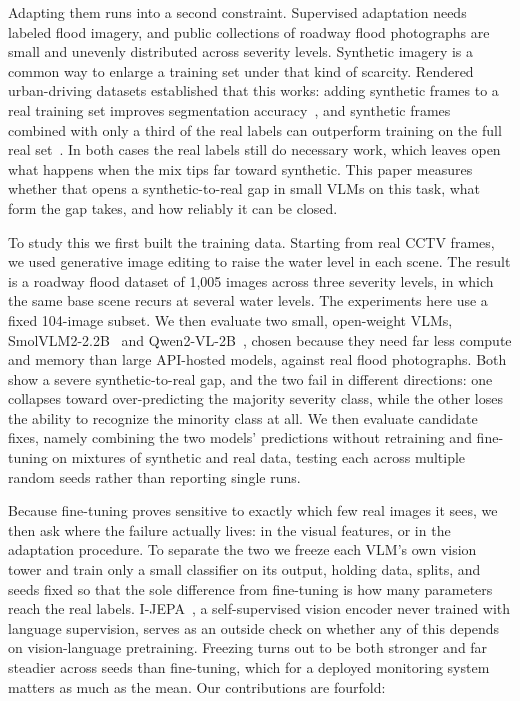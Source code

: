 \documentclass[conference]{IEEEtran}
\begin{document}
Adapting them runs into a second constraint. Supervised adaptation needs labeled flood imagery, and public collections of roadway flood photographs are small and unevenly distributed across severity levels. Synthetic imagery is a common way to enlarge a training set under that kind of scarcity. Rendered urban-driving datasets established that this works: adding synthetic frames to a real training set improves segmentation accuracy~\cite{ros2016synthia}, and synthetic frames combined with only a third of the real labels can outperform training on the full real set~\cite{richter2016playing}. In both cases the real labels still do necessary work, which leaves open what happens when the mix tips far toward synthetic. This paper measures whether that opens a synthetic-to-real gap in small VLMs on this task, what form the gap takes, and how reliably it can be closed.

To study this we first built the training data. Starting from real CCTV frames, we used generative image editing to raise the water level in each scene. The result is a roadway flood dataset of 1{,}005 images across three severity levels, in which the same base scene recurs at several water levels. The experiments here use a fixed 104-image subset. We then evaluate two small, open-weight VLMs, SmolVLM2-2.2B~\cite{marafioti2025smolvlm} and Qwen2-VL-2B~\cite{wang2024qwen2vl}, chosen because they need far less compute and memory than large API-hosted models, against real flood photographs. Both show a severe synthetic-to-real gap, and the two fail in different directions: one collapses toward over-predicting the majority severity class, while the other loses the ability to recognize the minority class at all. We then evaluate candidate fixes, namely combining the two models' predictions without retraining and fine-tuning on mixtures of synthetic and real data, testing each across multiple random seeds rather than reporting single runs.

Because fine-tuning proves sensitive to exactly which few real images it sees, we then ask where the failure actually lives: in the visual features, or in the adaptation procedure. To separate the two we freeze each VLM's own vision tower and train only a small classifier on its output, holding data, splits, and seeds fixed so that the sole difference from fine-tuning is how many parameters reach the real labels. I-JEPA~\cite{assran2023ijepa}, a self-supervised vision encoder never trained with language supervision, serves as an outside check on whether any of this depends on vision-language pretraining. Freezing turns out to be both stronger and far steadier across seeds than fine-tuning, which for a deployed monitoring system matters as much as the mean. Our contributions are fourfold:
\end{document}
